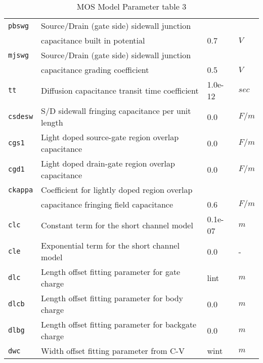 \documentclass{article}
\begin{document}
\begin{table}[H]
\begin{tabular}{|l| l| l| l|}
\texttt{pbswg} & Source/Drain (gate side) sidewall junction & & \\
                & capacitance built in potential & 0.7 & $V$\\
\texttt{mjswg} & Source/Drain (gate side) sidewall junction & & \\
                & capacitance grading coefficient & 0.5 & $V$\\
\texttt{tt} & Diffusion capacitance transit time coefficient & 1.0e-12 & $sec$\\
\texttt{csdesw} & S/D sidewall fringing capacitance per unit length & 0.0 & $F/m$\\
\texttt{cgs1} & Light doped source-gate region overlap capacitance & 0.0 & $F/m$\\
\texttt{cgd1} & Light doped drain-gate region overlap capacitance & 0.0 & $F/m$\\
\texttt{ckappa} & Coefficient for lightly doped region overlap & &\\
                & capacitance fringing field capacitance & 0.6 & $F/m$\\
\texttt{clc} & Constant term for the short channel model & 0.1e-07 & $m$\\
\texttt{cle} & Exponential term for the short channel model & 0.0 & -\\
\texttt{dlc} & Length offset fitting parameter for gate charge & lint & $m$\\
\texttt{dlcb} & Length offset fitting parameter for body charge & 0.0 & $m$\\
\texttt{dlbg} & Length offset fitting parameter for backgate charge & 0.0 & $m$\\
\texttt{dwc} & Width offset fitting parameter from C-V & wint & $m$\\
\hline
\end{tabular}
\caption{\label{bsim3soi.params3} MOS Model Parameter table 3}
\end{table}
\end{document}

